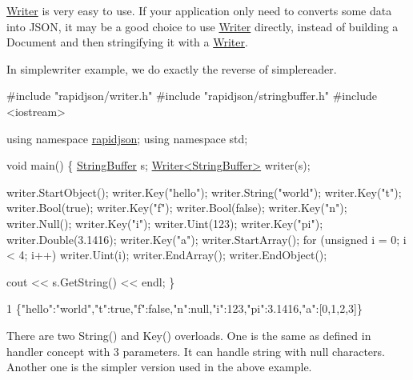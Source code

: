 {\ttfamily \hyperlink{class_writer}{Writer}} is very easy to use. If your application only need to converts some data into J\+S\+ON, it may be a good choice to use {\ttfamily \hyperlink{class_writer}{Writer}} directly, instead of building a {\ttfamily Document} and then stringifying it with a {\ttfamily \hyperlink{class_writer}{Writer}}.

In {\ttfamily simplewriter} example, we do exactly the reverse of {\ttfamily simplereader}.


\begin{DoxyCode}
\textcolor{preprocessor}{#include "rapidjson/writer.h"}
\textcolor{preprocessor}{#include "rapidjson/stringbuffer.h"}
\textcolor{preprocessor}{#include <iostream>}

\textcolor{keyword}{using namespace }\hyperlink{namespacerapidjson}{rapidjson};
\textcolor{keyword}{using namespace }std;

\textcolor{keywordtype}{void} main() \{
    \hyperlink{class_generic_string_buffer}{StringBuffer} s;
    \hyperlink{class_writer}{Writer<StringBuffer>} writer(s);

    writer.StartObject();
    writer.Key(\textcolor{stringliteral}{"hello"});
    writer.String(\textcolor{stringliteral}{"world"});
    writer.Key(\textcolor{stringliteral}{"t"});
    writer.Bool(\textcolor{keyword}{true});
    writer.Key(\textcolor{stringliteral}{"f"});
    writer.Bool(\textcolor{keyword}{false});
    writer.Key(\textcolor{stringliteral}{"n"});
    writer.Null();
    writer.Key(\textcolor{stringliteral}{"i"});
    writer.Uint(123);
    writer.Key(\textcolor{stringliteral}{"pi"});
    writer.Double(3.1416);
    writer.Key(\textcolor{stringliteral}{"a"});
    writer.StartArray();
    \textcolor{keywordflow}{for} (\textcolor{keywordtype}{unsigned} i = 0; i < 4; i++)
        writer.Uint(i);
    writer.EndArray();
    writer.EndObject();

    cout << s.GetString() << endl;
\}
\end{DoxyCode}



\begin{DoxyCode}
1 \{"hello":"world","t":true,"f":false,"n":null,"i":123,"pi":3.1416,"a":[0,1,2,3]\}
\end{DoxyCode}


There are two {\ttfamily String()} and {\ttfamily Key()} overloads. One is the same as defined in handler concept with 3 parameters. It can handle string with null characters. Another one is the simpler version used in the above example.

